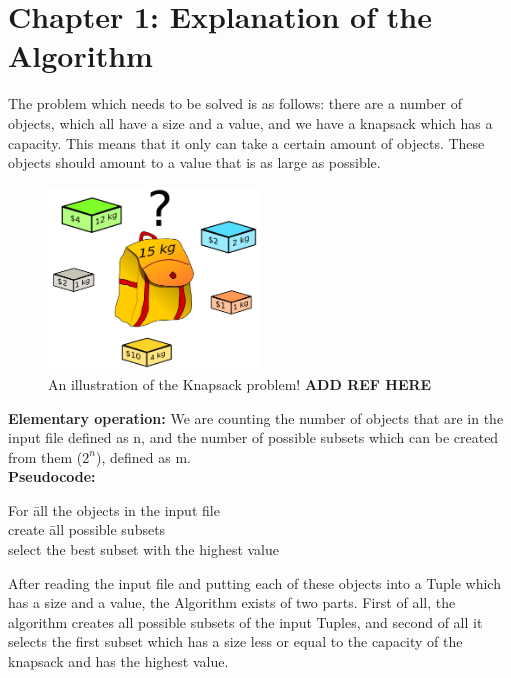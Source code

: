 \documentclass{article}
\begin{document}
\section*{Chapter 1:  Explanation of the Algorithm} 
 \noindent The problem which needs to be solved is as follows: there are a number of objects, which all have a size and a value, and we have a knapsack which has a capacity. This means that it only can take a certain amount of objects. These objects should amount to a value that is as large as possible.\\

\begin{figure}[h!]
  \centering
      \includegraphics[width=0.5\textwidth]{Knapsack.png}
  \caption{An illustration of the Knapsack problem! \textbf{ADD REF HERE} }
\end{figure}

\textbf{Elementary operation:} We are counting the number of objects that are in the input file defined as n, and the number of possible subsets which can be created from them ($2^n$), defined as m.\\

\noindent \textbf{Pseudocode:}
\begin{tabbing}
For \= all the objects in the input file \\
\> create \= all possible subsets	\\
\> select the best subset with the highest value\\
\end{tabbing}

After reading the input file and putting each of these objects into a Tuple which has a size and a value, the Algorithm exists of two parts. First of all, the algorithm creates all possible subsets of the input Tuples, and second of all it selects the first subset which has a size less or equal to the capacity of the knapsack and has the highest value.\\
 
\end{document}
